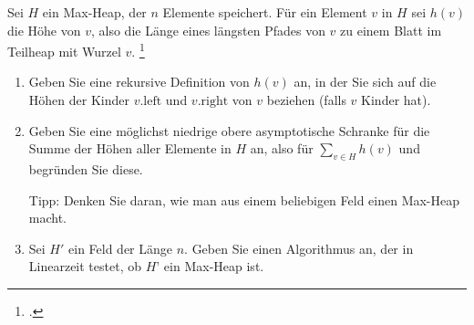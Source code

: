 \documentclass{bschlangaul-aufgabe}
\begin{document}

Sei $H$ ein Max-Heap, der $n$ Elemente speichert. Für ein Element $v$ in
$H$ sei $h(v)$ die Höhe von $v$, also die Länge eines längsten Pfades
von $v$ zu einem Blatt im Teilheap mit Wurzel $v$.
\footcite{examen:46115:2020:03}

\begin{enumerate}


\item Geben Sie eine rekursive Definition von $h(v)$ an, in der Sie sich
auf die Höhen der Kinder $v.\text{left}$ und $v.\text{right}$ von $v$
beziehen (falls $v$ Kinder hat).



\item Geben Sie eine möglichst niedrige obere asymptotische Schranke für
die Summe der Höhen aller Elemente in $H$ an, also für $\sum_{v \in H}
h(v)$ und begründen Sie diese.

Tipp: Denken Sie daran, wie man aus einem beliebigen Feld einen Max-Heap
macht.


\item Sei $H'$ ein Feld der Länge $n$. Geben Sie einen Algorithmus an,
der in Linearzeit testet, ob $H’$ ein Max-Heap ist.
\end{enumerate}
\end{document}
